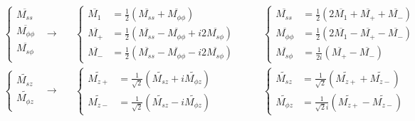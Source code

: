 \begin{equation}\label{eqn:conjugate-transform}
\begin{aligned}
    &\left\{\begin{aligned}
        \overline{M_{ss}} \\ 
        \overline{M_{\phi\phi}} \\ 
        \overline{M_{s\phi}} \\ 
    \end{aligned}\right. &\longrightarrow \quad 
    &\left\{\begin{aligned}
        \overline{M_1} &= \frac{1}{2} \left(\overline{M_{ss}} + \overline{M_{\phi\phi}}\right) \\ 
        \overline{M_+} &= \frac{1}{2} \left(\overline{M_{ss}} - \overline{M_{\phi\phi}} + i2 \overline{M_{s\phi}}\right) \\ 
        \overline{M_-} &= \frac{1}{2} \left(\overline{M_{ss}} - \overline{M_{\phi\phi}} - i2 \overline{M_{s\phi}}\right)
    \end{aligned}\right. &\quad
    &\left\{\begin{aligned}
        \overline{M_{ss}} &= \frac{1}{2} \left(2\overline{M_1} + \overline{M_+} + \overline{M_-}\right) \\ 
        \overline{M_{\phi\phi}} &= \frac{1}{2} \left(2\overline{M_1} - \overline{M_+} - \overline{M_-}\right) \\ 
        \overline{M_{s\phi}} &= \frac{1}{2i} \left(\overline{M_+} - \overline{M_-}\right)
    \end{aligned}\right. \\ 
    &\left\{\begin{aligned}
        \widetilde{M_{sz}} \\ 
        \widetilde{M_{\phi z}} \\ 
    \end{aligned}\right. &\longrightarrow \quad 
    &\left\{\begin{aligned}
        \widetilde{M_{z+}} &= \frac{1}{\sqrt{2}} \left(\widetilde{M_{sz}} + i\widetilde{M_{\phi z}}\right) \\ 
        \widetilde{M_{z-}} &= \frac{1}{\sqrt{2}} \left(\widetilde{M_{sz}} - i\widetilde{M_{\phi z}}\right)
    \end{aligned}\right. &\quad 
    &\left\{\begin{aligned}
        \widetilde{M_{sz}} &= \frac{1}{\sqrt{2}} \left(\widetilde{M_{z+}} + \widetilde{M_{z-}}\right) \\
        \widetilde{M_{\phi z}} &= \frac{1}{\sqrt{2}i} \left(\widetilde{M_{z+}} - \widetilde{M_{z-}}\right)

\end{aligned}
\end{aligned}
\end{equation}
